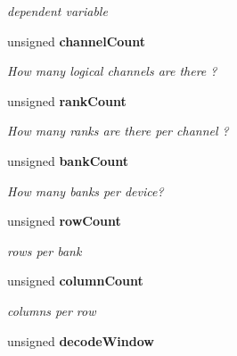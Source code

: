 \begin{DoxyCompactItemize}
\begin{DoxyCompactList}\small\item\em dependent variable \item\end{DoxyCompactList}\item 
unsigned {\bf channelCount}\label{class_d_r_a_msim_i_i_1_1_system_configuration_a412130db785c220ed1d2c43310e19364}

\begin{DoxyCompactList}\small\item\em How many logical channels are there ? \item\end{DoxyCompactList}\item 
unsigned {\bf rankCount}\label{class_d_r_a_msim_i_i_1_1_system_configuration_ac4ac59a449547cd27fa8ed069378e7b8}

\begin{DoxyCompactList}\small\item\em How many ranks are there per channel ? \item\end{DoxyCompactList}\item 
unsigned {\bf bankCount}\label{class_d_r_a_msim_i_i_1_1_system_configuration_a2f553342c595248f67602f541bae62f9}

\begin{DoxyCompactList}\small\item\em How many banks per device? \item\end{DoxyCompactList}\item 
unsigned {\bf rowCount}\label{class_d_r_a_msim_i_i_1_1_system_configuration_a6b49c8001b6f9c65aeebcfca03404bd0}

\begin{DoxyCompactList}\small\item\em rows per bank \item\end{DoxyCompactList}\item 
unsigned {\bf columnCount}\label{class_d_r_a_msim_i_i_1_1_system_configuration_a40ffc8cdfcd378bf864d648113f6b4b3}

\begin{DoxyCompactList}\small\item\em columns per row \item\end{DoxyCompactList}\item 
unsigned {\bf decodeWindow}\label{class_d_r_a_msim_i_i_1_1_system_configuration_ac870e61295fc38f0527aca83418602e2}


\end{DoxyCompactItemize}
